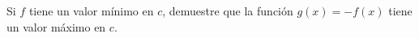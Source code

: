 \item Si $f$ tiene un valor mínimo en $c$, demuestre que la función $g(x) = -f(x)$ tiene un valor máximo en $c$.
